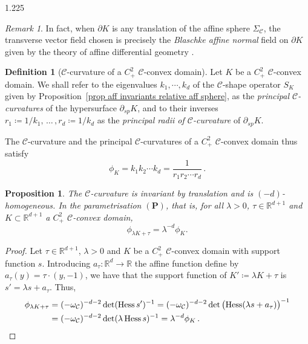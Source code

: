 \documentclass[reqno, a4paper]{amsart}
\numberwithin{equation}{section}
\numberwithin{figure}{section}
\newtheorem{proposition}[theorem]{Proposition}
\theoremstyle{definition}
\newtheorem{definition}[theorem]{Definition}
\theoremstyle{remark}
\newtheorem{remark}[theorem]{Remark}
\newcommand{\R}{\mathbb{R}} %
\DeclareMathOperator{\Hess}{Hess} %
\newcommand{\C}{\mathcal{C}} %
\renewcommand{\S}{\Sigma_\C} %
\newcommand{\bp}[1]{{\bigl( {#1} \bigr)}} %
\begin{document}
\begin{spacing}{1.225}
\begin{remark}
In fact, when $\partial K$ is any translation of the affine sphere $\S$, the transverse vector field chosen is precisely the \emph{Blaschke affine normal} field on $\partial K$ given by the theory of affine differential geometry \cite{Nomizu_Sassaki_95,Loftin_10,LSZH_15}. 
\end{remark}

\begin{definition}[$\C$-curvature of a $C^2_+$ $\C$-convex domain]
Let $K$ be a $C^2_+$ $\C$-convex domain. We shall refer to the eigenvalues $k_1,\cdots, k_d$ of the $\C$-shape operator $S_K$ given by Proposition~\ref{prop aff invariants relative aff sphere}, as the \emph{principal $\C$-curvatures} of the hypersurface $\partial_{sp} K$, and to their inverses $r_1\coloneqq 1/k_1,\, \dots \, ,r_d\coloneqq 1/k_d$ as the \emph{principal radii of $\C$-curvature} of $\partial_{sp} K$. 
\end{definition} 

The $\C$-curvature and the principal $\C$-curvatures of a $C^2_+$ $\C$-convex domain thus satisfy
\begin{equation*}
 \phi_K = k_1 k_2 \cdots k_d = \frac{1}{r_1 r_2 \cdots r_d} \, . 
\end{equation*}


\begin{proposition}
The $\C$-curvature is invariant by translation and is $(-d)$-homogeneous. In the parametrisation $(\mathbf{P})$, that is, for all $\lambda > 0$, $\tau \in \R^{d+1}$ and $K \subset \R^{d+1}$ a $C^2_+$ $\C$-convex domain,
\begin{equation*}
\phi_{\lambda K + \tau}= \lambda^{-d} \phi_K. 
\end{equation*}
\end{proposition}
\begin{proof}
Let $\tau \in \R^{d+1}$, $\lambda > 0$ and $K$ be a $C^2_+$ $\C$-convex domain with support function $s$. Introducing $a_\tau : \R^d \to \R$ the affine function define by $a_\tau(y) = \tau \cdot (y,-1)$, we have that the support function of $K' \coloneqq \lambda K + \tau$ is $s' = \lambda s+a_\tau$. Thus,
\begin{align*}
\phi_{\lambda K +\tau} & = (-\omega_\C)^{-d-2} \det(\Hess s')^{-1} = (-\omega_\C)^{-d-2} \det\bp{\Hess(\lambda s+a_\tau)}^{-1} \\
& = (-\omega_\C)^{-d-2} \det(\lambda\Hess s)^{-1} = \lambda^{-d} \phi_K \, . \qedhere
\end{align*}
\end{proof}


\end{spacing}
\end{document}
